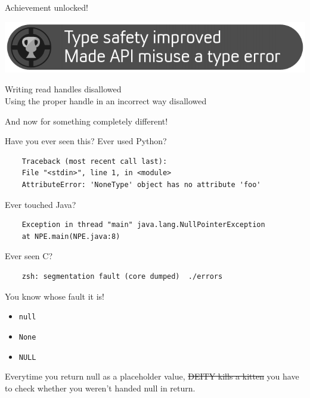 \documentclass{beamer}
\begin{document}
\begin{frame}{Achievement unlocked!}
  \begin{center}
    \includegraphics[width=\textwidth]{achivement-api-misuse}
  \end{center}
  \checkmark Writing read handles disallowed\\
  \checkmark Using the proper handle in an incorrect way disallowed
\end{frame}

\begin{frame}
  \begin{center}
    {\Huge And now for something completely different!}
  \end{center}
\end{frame}

\begin{frame}[fragile]{Have you ever seen this?}
  Ever used Python?
  \begin{verbatim}
    Traceback (most recent call last):
    File "<stdin>", line 1, in <module>
    AttributeError: 'NoneType' object has no attribute 'foo'
  \end{verbatim}
  \pause
  Ever touched Java?
  \begin{verbatim}
    Exception in thread "main" java.lang.NullPointerException
    at NPE.main(NPE.java:8)
  \end{verbatim}
  \pause
  Ever seen C?
  \begin{verbatim}
    zsh: segmentation fault (core dumped)  ./errors
  \end{verbatim}
\end{frame}

\begin{frame}{You know whose fault it is!}
  \begin{itemize}
    \item \texttt{null}
    \item \texttt{None}
    \item \texttt{NULL}
  \end{itemize}
  \pause
  Everytime you return null as a placeholder value,
  \sout{\textdollar{}DEITY kills a kitten}
  you have to check whether you weren't handed null in return.
\end{frame}
\end{document}
